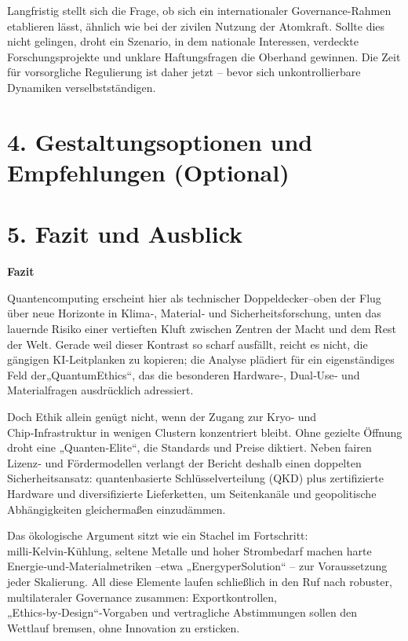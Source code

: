 Langfristig stellt sich die Frage, ob sich ein internationaler Governance-Rahmen etablieren lässt, ähnlich wie bei der zivilen Nutzung der Atomkraft. Sollte dies nicht gelingen, droht ein Szenario, in dem nationale Interessen, verdeckte Forschungsprojekte und unklare Haftungsfragen die Oberhand gewinnen. Die Zeit für vorsorgliche Regulierung ist daher jetzt – bevor sich unkontrollierbare Dynamiken verselbstständigen.

 


 

 
 

 

\section{4. Gestaltungsoptionen und Empfehlungen (Optional)}

\section{5. Fazit und Ausblick}
\textbf{Fazit}


Quantencomputing erscheint hier als technischer Doppeldecker–oben der Flug über neue Horizonte in Klima‑, Material‑ und Sicherheitsforschung, unten das lauernde Risiko einer vertieften Kluft zwischen Zentren der Macht und dem Rest der Welt. Gerade weil dieser Kontrast so scharf ausfällt, reicht es nicht, die gängigen KI‑Leitplanken zu kopieren; die Analyse plädiert für ein eigenständiges Feld der„QuantumEthics“, das die besonderen Hardware‑, Dual‑Use‑ und Materialfragen ausdrücklich adressiert.

Doch Ethik allein genügt nicht, wenn der Zugang zur Kryo‑ und Chip‑Infrastruktur in wenigen Clustern konzentriert bleibt. Ohne gezielte Öffnung droht eine „Quanten‑Elite“, die Standards und Preise diktiert. Neben fairen Lizenz‑ und Fördermodellen verlangt der Bericht deshalb einen doppelten Sicherheitsansatz: quantenbasierte Schlüsselverteilung (QKD) plus zertifizierte Hardware und diversifizierte Lieferketten, um Seitenkanäle und geopolitische Abhängigkeiten gleichermaßen einzudämmen.

Das ökologische Argument sitzt wie ein Stachel im Fortschritt: milli‑Kelvin‑Kühlung, seltene Metalle und hoher Strombedarf machen harte Energie‑und‑Materialmetriken –etwa „EnergyperSolution“ – zur Voraussetzung jeder Skalierung. All diese Elemente laufen schließlich in den Ruf nach robuster, multilateraler Governance zusammen: Exportkontrollen, „Ethics‑by‑Design“‑Vorgaben und vertragliche Abstimmungen sollen den Wettlauf bremsen, ohne Innovation zu ersticken.

